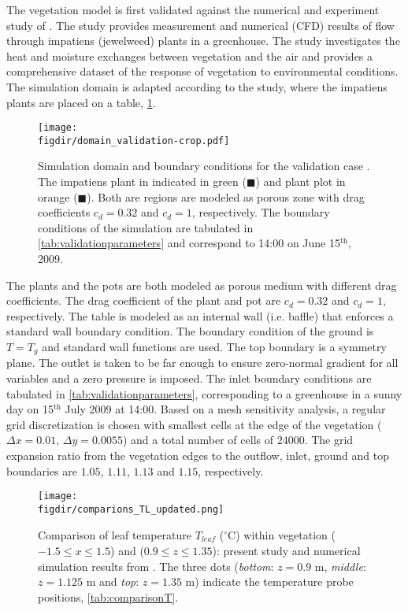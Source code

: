 The vegetation model is first validated against the numerical and experiment study of \cite{Kichah2012}. The study provides measurement and numerical (CFD) results of flow through impatiens (jewelweed) plants in a greenhouse. The study investigates the heat and moisture exchanges between vegetation and the air and provides a comprehensive dataset of the response of vegetation to environmental conditions. The simulation domain is adapted according to the study, where the impatiens plants are placed on a table, \cref{fig:domain_validation}.

	\begin{figure}[h]
		\centering
		\texttt{[image: \\figdir/domain\_validation-crop.pdf]}
		\caption{Simulation domain and boundary conditions for the validation case \cite{Kichah2012}. The impatiens plant in indicated in green ({\color{flatuidarkgreen}$\blacksquare$}) and plant plot in orange ({\color{flatuiorange}$\blacksquare$}). Both are regions are modeled as porous zone with drag coefficients $c_d=0.32$ and $c_d=1$, respectively. The boundary conditions of the simulation are tabulated in \cref{tab:validationparameters} and correspond to 14:00 on June 15$^{\mathrm{th}}$, 2009.}
		\label{fig:domain_validation}
	\end{figure}

The plants and the pots are both modeled as porous medium with different drag coefficients. The drag coefficient of the plant and pot are $c_d=0.32$ and $c_d=1$, respectively. The table is modeled as an internal wall (i.e. baffle) that enforces a standard wall boundary condition. The boundary condition of the ground is $T=T_g$ and standard wall functions are used. The top boundary is a symmetry plane. The outlet is taken to be far enough to ensure zero-normal gradient for all variables and a zero pressure is imposed. The inlet boundary conditions are tabulated in \cref{tab:validationparameters}, corresponding to a greenhouse in a sunny day on 15$^{\mathrm{th}}$ July 2009 at 14:00. Based on a mesh sensitivity analysis, a regular grid discretization is chosen with smallest cells at the edge of the vegetation ($\Delta x=0.01,\,\Delta y=\num{0.0055}$) and a total number of cells of \num{24000}. The grid expansion ratio from the vegetation edges to the outflow, inlet, ground and top boundaries are $1.05$, $1.11$, $1.13$ and $1.15$, respectively. 

	\begin{figure}[h]
	\centering
	\texttt{[image: \\figdir/comparions\_TL\_updated.png]}
	\caption{Comparison of leaf temperature $T_\mathit{leaf}$ ($^{\circ}$C) within vegetation ($-1.5\le x \le 1.5$) and ($0.9 \le z \le 1.35$):  present study and  numerical simulation results from \citep{Kichah2012}. The three dots (\textit{bottom}: $z=0.9$ m, \textit{middle}: $z=1.125$ m and \textit{top}: $z=1.35$ m) indicate the temperature probe positions, \cref{tab:comparisonT}.}
	\label{fig:comparions_TL_updated}
	\end{figure}


